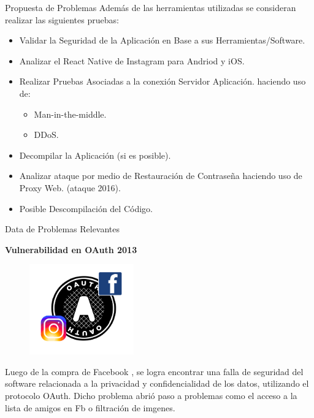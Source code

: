 \begin{frame}[t,fragile]{Propuesta de Problemas}
Además de las herramientas utilizadas se consideran realizar las siguientes pruebas:

\begin{itemize}
    \item Validar la Seguridad de la Aplicación en Base a sus Herramientas/Software.
    \item Analizar el React Native de Instagram para Andriod y iOS.
    \item Realizar Pruebas Asociadas a la conexión Servidor Aplicación. haciendo uso de:
    \begin{itemize}
        \item Man-in-the-middle.
        \item DDoS.
    \end{itemize}
    \item Decompilar la Aplicación (si es posible).
    \item  Analizar ataque por medio de Restauración de Contraseña haciendo uso de Proxy Web. (ataque 2016).
    \item Posible Descompilación del Código.
    
    
\end{itemize}



\end{frame}

\begin{frame}[t,fragile]{Data de Problemas Relevantes}

\textbf{Vulnerabilidad en OAuth 2013}


\begin{figure} 
\vspace{2pt}
  \begin{center}
    \includegraphics[width=0.4\textwidth]{oauth}
    \label{fig:databaseUserTable}
  \end{center}
  \vspace{2pt}
\end{figure} 

\bigskip

Luego de la compra de Facebook , se logra encontrar una falla de seguridad del software relacionada a la privacidad y confidencialidad de los datos, utilizando el protocolo OAuth. Dicho problema abrió paso a problemas como el acceso a la lista de amigos en Fb o filtración de imgenes.




\end{frame}

